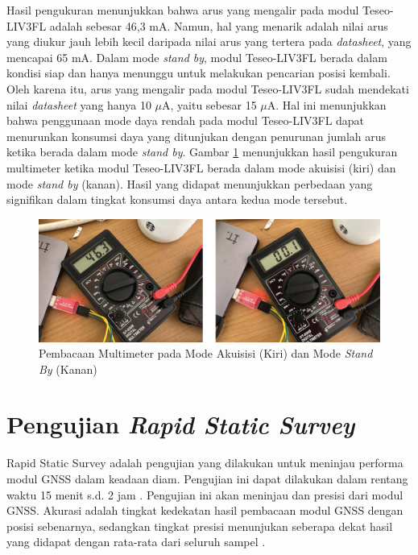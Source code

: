 Hasil pengukuran menunjukkan bahwa arus yang mengalir pada modul Teseo-LIV3FL adalah sebesar 46,3 mA. Namun, hal yang menarik adalah nilai arus yang diukur jauh lebih kecil daripada nilai arus yang tertera pada \textit{datasheet}, yang mencapai 65 mA. Dalam mode \textit{stand by}, modul Teseo-LIV3FL berada dalam kondisi siap dan hanya menunggu untuk melakukan pencarian posisi kembali. Oleh karena itu, arus yang mengalir pada modul Teseo-LIV3FL sudah mendekati nilai \textit{datasheet} yang hanya 10 $\mu$A, yaitu sebesar 15 $\mu$A. Hal ini menunjukkan bahwa penggunaan mode daya rendah pada modul Teseo-LIV3FL dapat menurunkan konsumsi daya yang ditunjukan dengan penurunan jumlah arus ketika berada dalam mode \textit{stand by}. Gambar \ref{Fig: low-power-result} menunjukkan hasil pengukuran multimeter ketika modul Teseo-LIV3FL berada dalam mode akuisisi (kiri) dan mode \textit{stand by} (kanan). Hasil yang didapat menunjukkan perbedaan yang signifikan dalam tingkat konsumsi daya antara kedua mode tersebut.

\begin{figure}[H]
	\centering
	\captionsetup{justification=centering}
	\includegraphics[width=14cm]{contents/chapter-4/low-power-result.jpg}
	\caption{Pembacaan Multimeter pada Mode Akuisisi (Kiri) dan Mode \textit{Stand By} (Kanan)}
	\label{Fig: low-power-result}
\end{figure}

\section{Pengujian \textit{Rapid Static Survey}}
Rapid Static Survey adalah pengujian yang dilakukan untuk meninjau performa modul GNSS dalam keadaan diam. Pengujian ini dapat dilakukan dalam rentang waktu 15 menit s.d. 2 jam \cite{lauer2019static}. Pengujian ini akan meninjau  dan presisi dari modul GNSS. Akurasi adalah tingkat kedekatan hasil pembacaan modul GNSS dengan posisi sebenarnya, sedangkan tingkat presisi menunjukan seberapa dekat hasil yang didapat dengan rata-rata dari seluruh sampel \cite{gnssca_apn029}.

